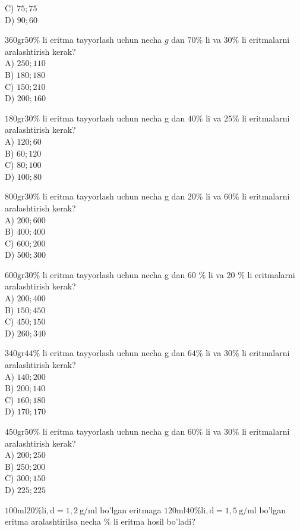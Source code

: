 C) $75 ; 75$\\
D) $90 ; 60$
  \item $360 \mathrm{gr} 50 \%$ li eritma tayyorlash uchun necha $g$ dan $70 \%$ li va $30 \%$ li eritmalarni aralashtirish kerak?\\
A) $250 ; 110$\\
B) $180 ; 180$\\
C) $150 ; 210$\\
D) $200 ; 160$
  \item $180 \mathrm{gr} 30 \%$ li eritma tayyorlash uchun necha g dan $40 \%$ li va $25 \%$ li eritmalarni aralashtirish kerak?\\
A) $120 ; 60$\\
B) $60 ; 120$\\
C) $80 ; 100$\\
D) $100 ; 80$
  \item $800 \mathrm{gr} 30 \%$ li eritma tayyorlash uchun necha g dan $20 \%$ li va $60 \%$ li eritmalarni aralashtirish kerak?\\
A) $200 ; 600$\\
B) $400 ; 400$\\
C) $600 ; 200$\\
D) $500 ; 300$
  \item $600 \mathrm{gr} 30 \%$ li eritma tayyorlash uchun necha g dan 60 \% li va 20 \% li eritmalarni aralashtirish kerak?\\
A) $200 ; 400$\\
B) $150 ; 450$\\
C) $450 ; 150$\\
D) $260 ; 340$
  \item $340 \mathrm{gr} 44 \%$ li eritma tayyorlash uchun necha g dan $64 \%$ li va $30 \%$ li eritmalarni aralashtirish kerak?\\
A) $140 ; 200$\\
B) $200 ; 140$\\
C) $160 ; 180$\\
D) $170 ; 170$
  \item $450 \mathrm{gr} 50 \%$ li eritma tayyorlash uchun necha g dan $60 \%$ li va $30 \%$ li eritmalarni aralashtirish kerak?\\
A) $200 ; 250$\\
B) $250 ; 200$\\
C) $300 ; 150$\\
D) $225 ; 225$
  \item $100 \mathrm{ml} 20 \% \mathrm{li}, \mathrm{d}=1,2 \mathrm{~g} / \mathrm{ml}$ bo'lgan eritmaga $120 \mathrm{ml} 40 \% \mathrm{li}, \mathrm{d}=1,5 \mathrm{~g} / \mathrm{ml}$ bo'lgan eritma aralashtirilsa necha \% li eritma hosil bo'ladi?\\
